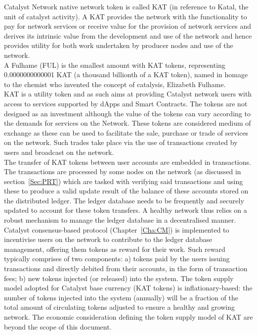 Catalyst Network native network token is called KAT (in reference to Katal, the unit of catalyst activity). A KAT provides the network with the functionality to pay for network services or receive value for the provision of network services and derives its intrinsic value from the development and use of the network and hence provides utility for both work undertaken by producer nodes and use of the network. \\

A Fulhame (FUL) is the smallest amount with KAT tokens, representing 0.0000000000001 KAT (a thousand billionth of a KAT token), named in homage to the chemist who invented the concept of catalysis, Elizabeth Fulhame.\\

KAT is a utility token and as such aims at providing Catalyst network users with access to services supported by dApps and Smart Contracts. The tokens are not designed as an investment although the value of the tokens can vary according to the demands for services on the Network. These tokens are considered medium of exchange as these can be used to facilitate the sale, purchase or trade of services on the network. Such trades take place via the use of transactions created by users and broadcast on the network. \\

The transfer of KAT tokens between user accounts are embedded in transactions. The transactions are processed by some nodes on the network (as discussed in section~\ref{Sec:PRT}) which are tasked with verifying said transactions and using these to produce a valid update result of the balance of these accounts stored on the distributed ledger. The ledger database needs to be frequently and securely updated to account for these token transfers. A healthy network thus relies on a robust mechanism to manage the ledger database in a decentralised manner. Catalyst consensus-based protocol (Chapter~\ref{Cha:CM}) is implemented to incentivise users on the network to contribute to the ledger database management, offering them tokens as reward for their work. Such reward typically comprises of two components: a) tokens paid by the users issuing transactions and directly debited from their accounts, in the form of transaction fees; b) new tokens injected (or released) into the system. The token supply model adopted for Catalyst base currency (KAT tokens) is inflationary-based: the number of tokens injected into the system (annually) will be a fraction of the total amount of circulating tokens adjusted to ensure a healthy and growing network. The economic consideration defining the token supply model of KAT are beyond the scope of this document. 
